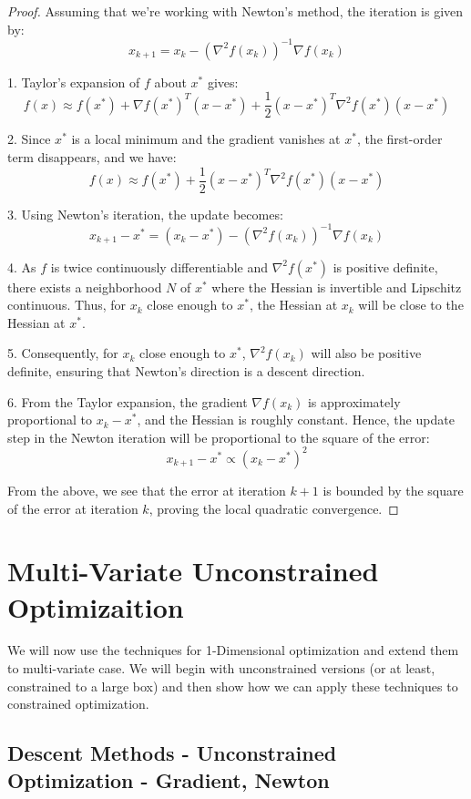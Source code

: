 \begin{proof}
Assuming that we're working with Newton's method, the iteration is given by:
\[
x_{k+1} = x_k - \left( \nabla^2 f(x_k) \right)^{-1} \nabla f(x_k)
\]

1. Taylor's expansion of $ f $ about $ x^* $ gives:
\[
f(x) \approx f(x^*) + \nabla f(x^*)^T (x - x^*) + \frac{1}{2} (x - x^*)^T \nabla^2 f(x^*) (x - x^*)
\]

2. Since $ x^* $ is a local minimum and the gradient vanishes at $ x^* $, the first-order term disappears, and we have:
\[
f(x) \approx f(x^*) + \frac{1}{2} (x - x^*)^T \nabla^2 f(x^*) (x - x^*)
\]

3. Using Newton's iteration, the update becomes:
\[
x_{k+1} - x^* = (x_k - x^*) - \left( \nabla^2 f(x_k) \right)^{-1} \nabla f(x_k)
\]

4. As $ f $ is twice continuously differentiable and $ \nabla^2 f(x^*) $ is positive definite, there exists a neighborhood $ N $ of $ x^* $ where the Hessian is invertible and Lipschitz continuous. Thus, for $ x_k $ close enough to $ x^* $, the Hessian at $ x_k $ will be close to the Hessian at $ x^* $.

5. Consequently, for $ x_k $ close enough to $ x^* $, $ \nabla^2 f(x_k) $ will also be positive definite, ensuring that Newton's direction is a descent direction.

6. From the Taylor expansion, the gradient $ \nabla f(x_k) $ is approximately proportional to $ x_k - x^* $, and the Hessian is roughly constant. Hence, the update step in the Newton iteration will be proportional to the square of the error:
\[
x_{k+1} - x^* \propto (x_k - x^*)^2
\]

From the above, we see that the error at iteration $ k+1 $ is bounded by the square of the error at iteration $ k $, proving the local quadratic convergence.
\end{proof}


\section{Multi-Variate Unconstrained Optimizaition}
We will now use the techniques for 1-Dimensional optimization and extend them to multi-variate case.  We will begin with unconstrained versions (or at least, constrained to a large box) and then show how we can apply these techniques to constrained optimization.

\subsection{Descent Methods - Unconstrained Optimization - Gradient, Newton} 

